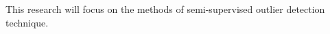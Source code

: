 This research will focus on the methods of semi-supervised outlier detection technique.
\begin{comment}
\textbf{ML in Outlier detection}

There are various models/methods in machine learning that are used in outlier detection. Figure~\ref{ML-OutlierDetection} describes the approach that is used in supervised, semi-supervised and unsupervised techniques. The first two techniques required data to train the predictive model/method, unlike unsupervised outlier detection technique.

This research will focus on the methods of semi-supervised outlier detection technique.

\begin{figure}[H]
\centering 
\texttt{[image: images/OutlierDetection-grayscale]}
\caption{Outlier detection techniques in machine learning \citep{Goldstein}.}
\label{ML-OutlierDetection}
\end{figure}
\end{comment}